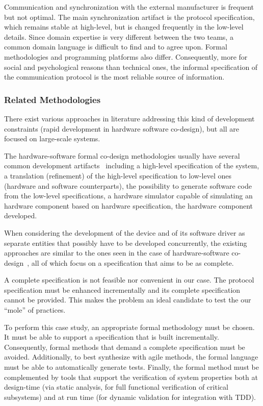 \documentclass[english]{lni}
\begin{document}
Communication and synchronization with the external manufacturer is
frequent but not optimal.  The main synchronization artifact is the
protocol specification, which remains stable at high-level, but is
changed frequently in the low-level details.  Since domain expertise
is very different between the two teams, a common domain language is
difficult to find and to agree upon.  Formal methodologies and
programming platforms also differ.  Consequently, more for social and
psychological reasons than technical ones, the informal specification
of the communication protocol is the most reliable source of
information.

\subsubsection{Related Methodologies}
\label{sec:relat-meth}

There exist various approaches in literature addressing this kind of
development constraints (rapid development in hardware software
co-design), but all are focused on large-scale systems.  

The hardware-software formal co-design methodologies usually have
several common development artifacts~\cite{Slomka2000, Hoffman2001}
including a high-level specification of the system, a translation
(refinement) of the high-level specification to low-level ones
(hardware and software counterparts), the possibility to generate
software code from the low-level specifications, a hardware simulator
capable of simulating an hardware component based on hardware
specification, the hardware component developed.

When considering the development of the device and of its software
driver as separate entities that possibly have to be developed
concurrently, the existing approaches are similar to the ones seen in
the case of hardware-software co-design~\cite{Valderrama1995,
  Siegmund2002, Ryzhyk2009}, all of which focus on a specification
that aims to be as complete.

A complete specification is not feasible nor convenient in our case.
The protocol specification must be enhanced incrementally and its
complete specification cannot be provided.  This makes the problem an
ideal candidate to test the our ``mole'' of practices.

To perform this case study, an appropriate formal methodology must be
chosen.  It must be able to support a specification that is built
incrementally.  Consequently, formal methods that demand a complete
specification must be avoided.  Additionally,
to best synthesize with agile methods, the formal language must be
able to automatically generate tests.  Finally, the formal method must
be complemented by tools that support the verification of system
properties both at design-time (via static analysis, for full
functional verification of critical subsystems) and at run time (for
dynamic validation for integration with TDD).
\end{document}
